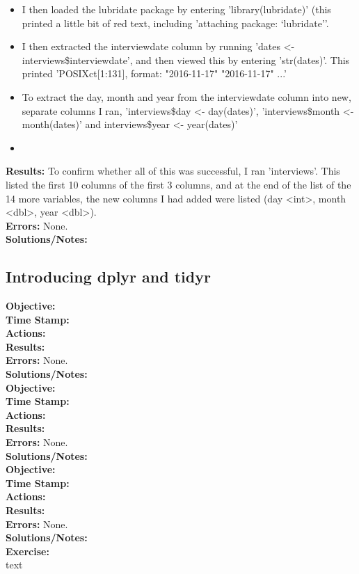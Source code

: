 \documentclass{article}
\begin{document}
\begin{FlushLeft}
\begin{itemize}
    \item I then loaded the lubridate package by entering 'library(lubridate)' (this printed a little bit of red text, including 'attaching package: ‘lubridate’'.
    \item I then extracted the interview\textunderscore date column by running 'dates \textless - interviews\$interview\textunderscore date', and then viewed this by entering 'str(dates)'. This printed  'POSIXct[1:131], format: "2016-11-17" "2016-11-17" ...'
    \item To extract the day, month and year from the interview\textunderscore date column into new, separate columns I ran, 'interviews\$day <- day(dates)', 'interviews\$month <- month(dates)' and 
    interviews\$year <- year(dates)'
    \item 
\end{itemize}
\textbf{Results:} To confirm whether all of this was successful, I ran 'interviews'. This listed the first 10 columns of the first 3 columns, and at the end of the list of the 14 more variables, the new columns I had added were listed (day <int>, month <dbl>, year <dbl>).\\
\textbf{Errors:} None.\\
\textbf{Solutions/Notes:}\\

\subsection{Introducing dplyr and tidyr}
\textbf{Objective: }\\ 
\textbf{Time Stamp:} \\
\textbf{Actions:} \\
\textbf{Results:}\\
\textbf{Errors:} None.\\
\textbf{Solutions/Notes:}\\
\vspace{5mm}
\textbf{Objective: }\\ 
\textbf{Time Stamp:} \\
\textbf{Actions:} \\
\textbf{Results:}\\
\textbf{Errors:} None.\\
\textbf{Solutions/Notes:}\\
\vspace{5mm}
\textbf{Objective: }\\ 
\textbf{Time Stamp:} \\
\textbf{Actions:} \\
\textbf{Results:}\\
\textbf{Errors:} None.\\
\textbf{Solutions/Notes:}\\
\vspace{5mm}
\textbf{Exercise: }\\ 
text\\


\end{FlushLeft}
\end{document}
